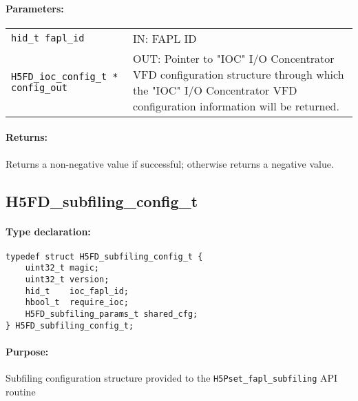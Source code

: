 \documentclass[../main.tex]{subfiles}
\begin{document}
\paragraph{Parameters:}
\begin{flushleft}%
 \begin{tabular}{lp{}}%
   \texttt{hid\_t fapl\_id} & IN: \Gls{FAPL} ID \\
   \texttt{H5FD\_ioc\_config\_t * config\_out} & OUT: Pointer to
   "IOC" I/O Concentrator VFD configuration structure through which the "IOC" I/O Concentrator
   VFD configuration information will be returned. \\
 \end{tabular}%
\end{flushleft}%

\paragraph{Returns:}
\begin{flushleft}%
Returns a non-negative value if successful; otherwise returns a negative value.
\end{flushleft}%

\newpage

\subsection{H5FD\_subfiling\_config\_t}
\label{ref:h5fd_subfiling_config_t}

\paragraph{Type declaration:}
\begin{flushleft}%
\begin{verbatim}
typedef struct H5FD_subfiling_config_t {
    uint32_t magic;
    uint32_t version;
    hid_t    ioc_fapl_id;
    hbool_t  require_ioc;
    H5FD_subfiling_params_t shared_cfg;
} H5FD_subfiling_config_t;
\end{verbatim}
\end{flushleft}%

\paragraph{Purpose:}
\begin{flushleft}%
Subfiling configuration structure provided to the \texttt{H5Pset\_fapl\_subfiling} API routine
\end{flushleft}%
\end{document}
